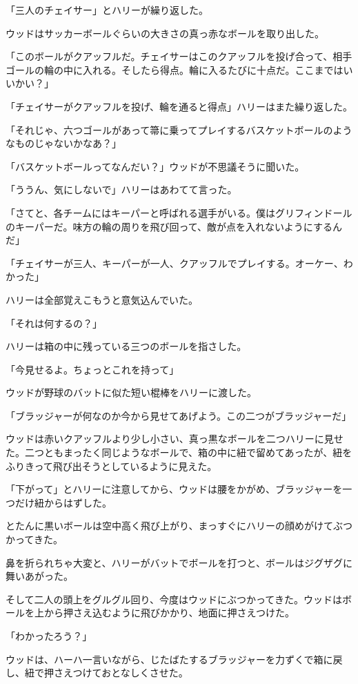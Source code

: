 \documentclass[10pt,a4paper]{article}
\begin{document}
\begin{CJK}{UTF8}{min}
「三人のチェイサー」とハリーが繰り返した。

ウッドはサッカーボールぐらいの大きさの真っ赤なボールを取り出した。

「このボールがクアッフルだ。チェイサーはこのクアッフルを投げ合って、相手ゴールの輪の中に入れる。そしたら得点。輪に入るたびに十点だ。ここまではいいかい？」

「チェイサーがクアッフルを投げ、輪を通ると得点」ハリーはまた繰り返した。

「それじゃ、六つゴールがあって箒に乗ってプレイするバスケットボールのようなものじゃないかなあ？」

「バスケットボールってなんだい？」ウッドが不思議そうに聞いた。

「ううん、気にしないで」ハリーはあわてて言った。

「さてと、各チームにはキーパーと呼ばれる選手がいる。僕はグリフィンドールのキーパーだ。味方の輪の周りを飛び回って、敵が点を入れないようにするんだ」

「チェイサーが三人、キーパーが一人、クアッフルでプレイする。オーケー、わかった」

ハリーは全部覚えこもうと意気込んでいた。

「それは何するの？」

ハリーは箱の中に残っている三つのボールを指さした。

「今見せるよ。ちょっとこれを持って」

ウッドが野球のバットに似た短い棍棒をハリーに渡した。

「ブラッジャーが何なのか今から見せてあげよう。この二つがブラッジャーだ」

ウッドは赤いクアッフルより少し小さい、真っ黒なボールを二つハリーに見せた。二つともまったく同じようなボールで、箱の中に紐で留めてあったが、紐をふりきって飛び出そうとしているように見えた。

「下がって」とハリーに注意してから、ウッドは腰をかがめ、ブラッジャーを一つだけ紐からはずした。

とたんに黒いボールは空中高く飛び上がり、まっすぐにハリーの顔めがけてぶつかってきた。

鼻を折られちゃ大変と、ハリーがバットでボールを打つと、ボールはジグザグに舞いあがった。

そして二人の頭上をグルグル回り、今度はウッドにぶつかってきた。ウッドはボールを上から押さえ込むように飛びかかり、地面に押さえつけた。

「わかったろう？」

ウッドは、ハーハ一言いながら、じたばたするブラッジャーを力ずくで箱に戻し、紐で押さえつけておとなしくさせた。


\end{CJK}
\end{document}
